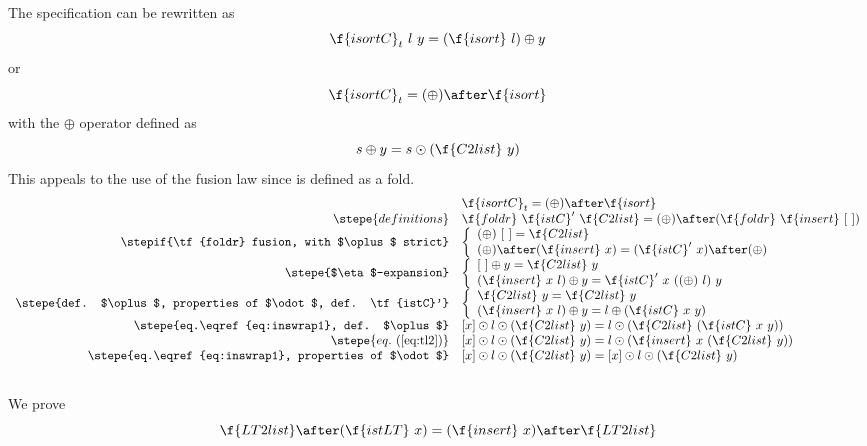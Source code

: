 \documentclass[a4paper,11pt]{llncs}
\begin{document}
\proof
The specification can be rewritten as
$$
\f{isortC}_t\ l\ y = (\f{isort}\ l) \oplus y
$$
or 
$$
\f{isortC}_t = (\oplus) \after \f{isort}
$$
with the $\oplus$ operator defined as
$$
s \oplus y= s \odot (\f{C2list}\ y)
$$
This appeals to the use of the fusion law since  is defined
as a fold.
$$
\begin{array}{rl}
  & \f{isortC}_t = (\oplus) \after \f{isort}\\
  \stepe{definitions}
  & \f{foldr}\ \f{istC}'\ \f{C2list} = (\oplus) \after (\f{foldr}\ \f{insert}\ [\ ])\\
  \stepif{\tf{foldr} fusion, with $\oplus$ strict}
  & \left \{ 
    \begin{array}{l}
    (\oplus)\ [\ ] = \f{C2list}\\
(\oplus) \after (\f{insert}\ x) = (\f{istC}'\ x) \after (\oplus)
  \end{array}
  \right .\\
  \stepe{$\eta$-expansion}
  & \left \{ 
    \begin{array}{l}
  [\ ] \oplus y = \f{C2list}\ y\\
  (\f{insert}\ x\ l) \oplus y = \f{istC}'\ x\ ((\oplus)\ l)\ y
  \end{array}
  \right .\\
  \stepe{def. $\oplus$, properties of $\odot$, def. \tf{istC}'} 
  & \left \{ 
    \begin{array}{l}
  \f{C2list}\ y = \f{C2list}\ y\\
  (\f{insert}\ x\ l) \oplus y = l \oplus (\f{istC}\ x\ y)
  \end{array}
  \right .\\
  \stepe{eq.\eqref{eq:inswrap1}, def. $\oplus$}
  & [x] \odot l \odot (\f{C2list}\ y) = l \odot (\f{C2list}\ (\f{istC}\ x\ y))\\
  \stepe{eq.~(\ref{eq:tl2})}
  & [x] \odot l \odot (\f{C2list}\ y) = l \odot (\f{insert}\ x\
  (\f{C2list}\ y))\\
  \stepe{eq.\eqref{eq:inswrap1}, properties of $\odot$}
  & [x] \odot l \odot (\f{C2list}\ y) = [x] \odot l \odot (\f{C2list}\ y)
\end{array}
$$
\endproof


\subsection{}
\label{app:sec:istLT}






We prove
$$
\f{LT2list} \after (\f{istLT}\ x)  = (\f{insert}\ x) \after
\f{LT2list}
$$
\end{document}
